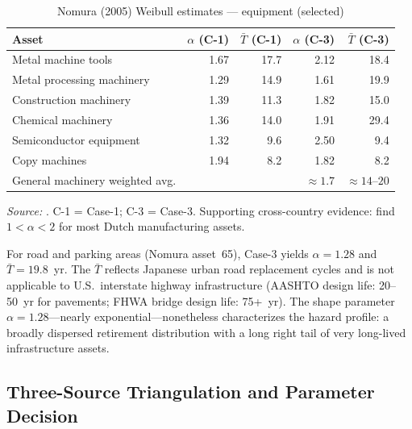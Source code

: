 \begin{table}[htbp]
\centering
\caption{Nomura (2005) Weibull estimates --- equipment (selected)}
\label{tab:ret:nomura_equipment}
\begin{threeparttable}
\begin{tabular}{lrrrr}
\toprule
Asset & $\alpha$ (C-1) & $\bar{T}$ (C-1) & $\alpha$ (C-3) & $\bar{T}$ (C-3) \\
\midrule
Metal machine tools        & 1.67 & 17.7 & 2.12 & 18.4 \\
Metal processing machinery & 1.29 & 14.9 & 1.61 & 19.9 \\
Construction machinery     & 1.39 & 11.3 & 1.82 & 15.0 \\
Chemical machinery         & 1.36 & 14.0 & 1.91 & 29.4 \\
Semiconductor equipment    & 1.32 &  9.6 & 2.50 &  9.4 \\
Copy machines              & 1.94 &  8.2 & 1.82 &  8.2 \\
\midrule
General machinery weighted avg. & & & $\approx 1.7$ & $\approx 14$--$20$ \\
\bottomrule
\end{tabular}
\begin{tablenotes}
\small
\item \textit{Source:} \citet[Tables~3 and~5]{Nomura2005}. C-1 = Case-1;
C-3 = Case-3. Supporting cross-country evidence: \citet{Meinen1998} find
$1 < \alpha < 2$ for most Dutch manufacturing assets.
\end{tablenotes}
\end{threeparttable}
\end{table}

For road and parking areas (Nomura asset~65), Case-3 yields
$\alpha = 1.28$ and $\bar{T} = 19.8$~yr. The $\bar{T}$ reflects Japanese urban
road replacement cycles and is not applicable to U.S.\ interstate highway
infrastructure (AASHTO design life: 20--50~yr for pavements; FHWA bridge design
life: 75+~yr). The shape parameter~$\alpha = 1.28$---nearly
exponential---nonetheless characterizes the hazard profile: a broadly dispersed
retirement distribution with a long right tail of very long-lived infrastructure
assets.


\subsection{Three-Source Triangulation and Parameter Decision}
\label{app:ret:triangulation}

